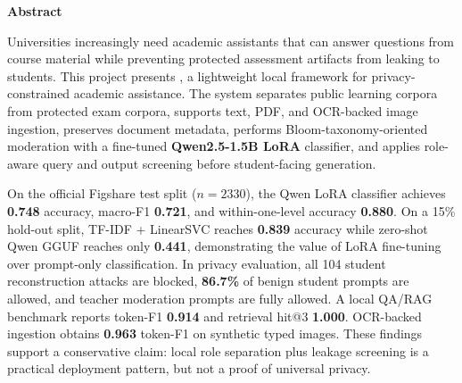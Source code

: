 \newpage
\begin{center}
    \Large
    \textbf{Abstract}\\
    \vspace{0.5cm}
\end{center}

Universities increasingly need academic assistants that can answer questions from course material while preventing protected assessment artifacts from leaking to students. This project presents \systemname, a lightweight local framework for privacy-constrained academic assistance. The system separates public learning corpora from protected exam corpora, supports text, PDF, and OCR-backed image ingestion, preserves document metadata, performs Bloom-taxonomy-oriented moderation with a fine-tuned \textbf{Qwen2.5-1.5B LoRA} classifier, and applies role-aware query and output screening before student-facing generation.

On the official Figshare test split ($n{=}2330$), the Qwen LoRA classifier achieves \textbf{0.748} accuracy, macro-F1 \textbf{0.721}, and within-one-level accuracy \textbf{0.880}. On a 15\% hold-out split, TF-IDF + LinearSVC reaches \textbf{0.839} accuracy while zero-shot Qwen GGUF reaches only \textbf{0.441}, demonstrating the value of LoRA fine-tuning over prompt-only classification. In privacy evaluation, all 104 student reconstruction attacks are blocked, \textbf{86.7\%} of benign student prompts are allowed, and teacher moderation prompts are fully allowed. A local QA/RAG benchmark reports token-F1 \textbf{0.914} and retrieval hit@3 \textbf{1.000}. OCR-backed ingestion obtains \textbf{0.963} token-F1 on synthetic typed images. These findings support a conservative claim: local role separation plus leakage screening is a practical deployment pattern, but not a proof of universal privacy.
